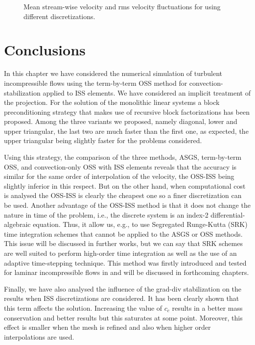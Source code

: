 \begin{figure}[h!]
	\caption{Mean stream-wise velocity and rms velocity fluctuations for using different discretizations.}
	\label{fig-cha_refinement_vel}
\end{figure}

\section{Conclusions}
\label{sec-conclusions}
In this chapter we have considered the numerical simulation of turbulent incompressible flows using the term-by-term OSS method for convection-stabilization applied to ISS elements. We have considered an implicit treatment of the projection. For the solution of the monolithic linear systems a  block preconditioning strategy that makes use of recursive block factorizations has been proposed. Among the three variants we proposed, namely diagonal, lower and upper triangular, the last two are much faster than the first one, as expected, the upper triangular being slightly faster for the problems considered. 

Using this strategy, the comparison of the three methods, ASGS, term-by-term OSS, and convection-only OSS with ISS elements reveals that the accuracy is similar for the same order of interpolation of the velocity, the OSS-ISS being slightly inferior in this respect. But on the other hand, when computational cost is analysed the OSS-ISS is clearly the cheapest one so a finer discretization can be used. Another advantage of the OSS-ISS method is that it does not change the nature in time of the problem, i.e., the discrete system is an index-2 differential-algebraic equation. Thus, it allow us, e.g., to use Segregated Runge-Kutta (SRK) time integration schemes that cannot be applied to the ASGS or OSS methods. This issue will be discussed in further works, but we can say that SRK schemes are well suited to perform high-order time integration as well as the use of an adaptive time-stepping technique. This method was firstly introduced and tested for laminar incompressible flows in \cite{colomes_segregated_2015} and will be discussed in forthcoming chapters.

Finally, we have also analysed the influence of the grad-div stabilization on the results when ISS discretizations are considered. It has been clearly shown that this term affects the solution. Increasing the value of $c_c$ results in a better mass conservation and better results but this saturates at some point. Moreover, this effect is smaller when the mesh is refined and also when higher order interpolations are used.